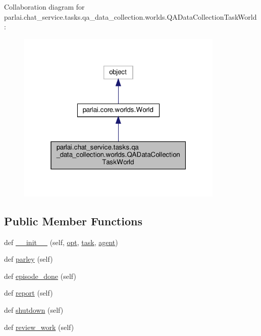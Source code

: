 Collaboration diagram for parlai.\+chat\+\_\+service.\+tasks.\+qa\+\_\+data\+\_\+collection.\+worlds.\+Q\+A\+Data\+Collection\+Task\+World\+:
\nopagebreak
\begin{figure}[H]
\begin{center}
\leavevmode
\includegraphics[width=280pt]{d4/d14/classparlai_1_1chat__service_1_1tasks_1_1qa__data__collection_1_1worlds_1_1QADataCollectionTaskWorld__coll__graph}
\end{center}
\end{figure}
\subsection*{Public Member Functions}
\begin{DoxyCompactItemize}
\item 
def \hyperlink{classparlai_1_1chat__service_1_1tasks_1_1qa__data__collection_1_1worlds_1_1QADataCollectionTaskWorld_ab84f1948bc80ae0de93567ea3e4488f2}{\+\_\+\+\_\+init\+\_\+\+\_\+} (self, \hyperlink{classparlai_1_1core_1_1worlds_1_1World_a3640d92718acd3e6942a28c1ab3678bd}{opt}, \hyperlink{classparlai_1_1chat__service_1_1tasks_1_1qa__data__collection_1_1worlds_1_1QADataCollectionTaskWorld_a2299f4d3d23e9d08be9430814aad9472}{task}, \hyperlink{classparlai_1_1chat__service_1_1tasks_1_1qa__data__collection_1_1worlds_1_1QADataCollectionTaskWorld_a2070bf88d1309e9f11d402ae58ae58cb}{agent})
\item 
def \hyperlink{classparlai_1_1chat__service_1_1tasks_1_1qa__data__collection_1_1worlds_1_1QADataCollectionTaskWorld_a2732be86dc4eba1255f5c27414f345d3}{parley} (self)
\item 
def \hyperlink{classparlai_1_1chat__service_1_1tasks_1_1qa__data__collection_1_1worlds_1_1QADataCollectionTaskWorld_aedbef1585d18e42ebed879e90cfc56a1}{episode\+\_\+done} (self)
\item 
def \hyperlink{classparlai_1_1chat__service_1_1tasks_1_1qa__data__collection_1_1worlds_1_1QADataCollectionTaskWorld_ab755c8e5982a600d176532d06fe50f3b}{report} (self)
\item 
def \hyperlink{classparlai_1_1chat__service_1_1tasks_1_1qa__data__collection_1_1worlds_1_1QADataCollectionTaskWorld_ac7f73536d3af94b755380148a9326a81}{shutdown} (self)
\item 
def \hyperlink{classparlai_1_1chat__service_1_1tasks_1_1qa__data__collection_1_1worlds_1_1QADataCollectionTaskWorld_af9036c044a97aeab846fbebad1c926ba}{review\+\_\+work} (self)
\end{DoxyCompactItemize}
